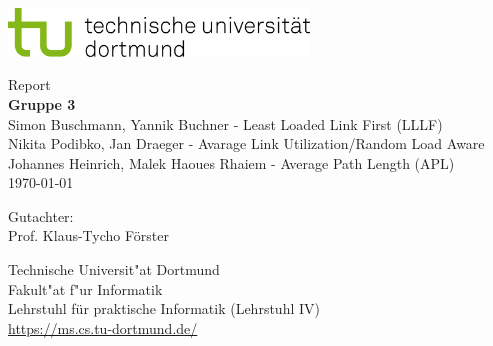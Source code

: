 \begin{titlepage}
\vspace*{-2cm}
\newlength{\links}
\setlength{\links}{-1.5cm}
\sffamily
\hspace*{\links}
\begin{minipage}{12.5cm}
\includegraphics[width=8cm]{bilder/tud_logo_rgb}
\end{minipage}

\vspace*{4cm}

\hspace*{\links}
\hspace*{-0.2cm}
\begin{minipage}{15cm}
\large
\begin{center}
{\Large Report} \\
\vspace*{1cm}
\textbf{Gruppe 3} \\
\vspace*{1cm}
Simon Buschmann, Yannik Buchner - Least Loaded Link First (LLLF) \\
Nikita Podibko, Jan Draeger - Avarage Link Utilization/Random Load Aware \\ 
Johannes Heinrich, Malek Haoues Rhaiem - Average Path Length (APL) \\
\today
\end{center}
\end{minipage}
\normalsize
\vspace*{5.5cm}


\vspace*{2.1cm}

\hspace*{\links}
\begin{minipage}[b]{5cm}
\raggedright
Gutachter: \\
Prof. Klaus-Tycho Förster \\
\end{minipage}

\vspace*{2.5cm}
\hspace*{\links}
\begin{minipage}[b]{8cm}
\raggedright
Technische Universit"at Dortmund \\
Fakult"at f"ur Informatik\\
Lehrstuhl für praktische Informatik (Lehrstuhl IV)\\
\url{https://ms.cs.tu-dortmund.de/}
\end{minipage}

\end{titlepage}
